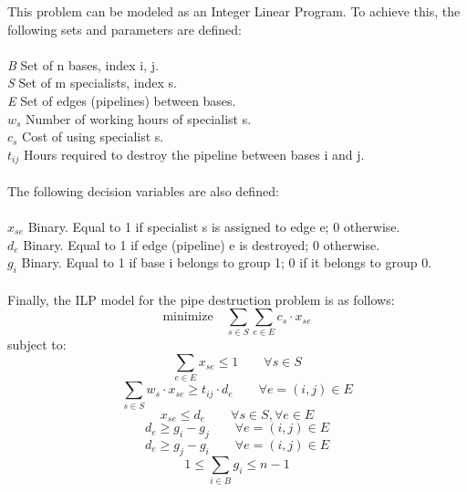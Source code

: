 \documentclass{article}
\begin{document}
This problem can be modeled as an Integer Linear Program. To achieve this, the following sets and parameters are defined:\\
\\
\textit{B} \hspace{1.3cm} Set of n bases, index i, j. \\
\textit{S} \hspace{1.3cm} Set of m specialists, index s. \\
\textit{E} \hspace{1.3cm} Set of edges (pipelines) between bases. \\
\textit{$w_s$} \hspace{1.15cm} Number of working hours of specialist s. \\
\textit{$c_s$} \hspace{1.25cm} Cost of using specialist s. \\
\textit{$t_{ij}$} \hspace{1.25cm} Hours required to destroy the pipeline between bases i and j. \\
\\
The following decision variables are also defined:\\
\\
\textit{$x_{se}$} \hspace{1.15cm} Binary. Equal to 1 if specialist s is assigned to edge e; 0 otherwise. \\
\textit{$d_e$} \hspace{1.25cm} Binary. Equal to 1 if edge (pipeline) e is destroyed; 0 otherwise. \\
\textit{$g_i$} \hspace{1.3cm} Binary. Equal to 1 if base i belongs to group 1; 0 if it belongs to group 0. \\
\\
Finally, the ILP model for the pipe destruction problem is as follows:
\begin{equation}
    \textrm{minimize} \quad \sum_{s \in S} \sum_{e \in E} c_s \cdot x_{se}
\end{equation}
subject to:
\begin{equation}
    \sum_{e \in E} x_{se} \leq 1 \qquad \forall s \in S
\end{equation}
\begin{equation}
    \sum_{s \in S} w_s \cdot x_{se} \geq t_{ij} \cdot d_e \qquad \forall e = (i,j) \in E
\end{equation}
\begin{equation}
    x_{se} \leq d_e \qquad \forall s \in S, \forall e \in E
\end{equation}
\begin{equation}
    d_e \geq g_i - g_j \qquad \forall e = (i,j) \in E
\end{equation}
\begin{equation}
    d_e \geq g_j - g_i \qquad \forall e = (i,j) \in E
\end{equation}
\begin{equation}
    1 \leq \sum_{i \in B} g_i \leq n-1
\end{equation}
\\
\end{document}
